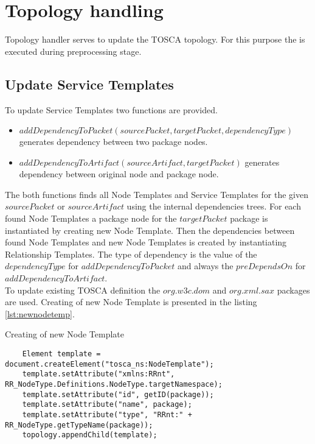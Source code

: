 \section{Topology handling}
Topology handler serves to update the TOSCA topology.
For this purpose the  is executed during preprocessing stage.

\subsection*{Update Service Templates}
To update Service Templates two functions are provided.
\begin{itemize}
	\item $addDependencyToPacket(sourcePacket,targetPacket,dependencyType)$ generates dependency between two package nodes.
	\item $addDependencyToArtifact(sourceArtifact, targetPacket)$ generates dependency between original node and package node.
\end{itemize} 
The both functions finds all Node Templates and Service Templates for the given $sourcePacket$ or $sourceArtifact$ using the internal dependencies trees.
For each found Node Templates a package node for the $targetPacket$ package is instantiated by creating new Node Template.
Then the dependencies between found Node Templates and new Node Templates is created by instantiating Relationship Templates.
The type of dependency is the value of the $dependencyType$ for $addDependencyToPacket$ and always the $preDependsOn$ for $addDependencyToArtifact$.\\
To update existing TOSCA definition the $org$.$w3c$.$dom$ and $org$.$xml$.$sax$ packages are used. 
Creating of new Node Template is presented in the listing \ref{lst:newnodetemp}.
\begin{Listing}
	\caption{Creating of new Node Template}
	\label{lst:newnodetemp}
	\begin{lstlisting}  
	Element template = document.createElement("tosca_ns:NodeTemplate");
	template.setAttribute("xmlns:RRnt", RR_NodeType.Definitions.NodeType.targetNamespace);
	template.setAttribute("id", getID(package));
	template.setAttribute("name", package);
	template.setAttribute("type", "RRnt:" + RR_NodeType.getTypeName(package));
	topology.appendChild(template);
	\end{lstlisting}
\end{Listing}
